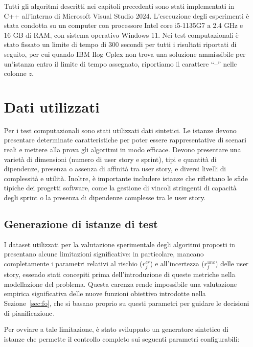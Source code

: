 \documentclass[12pt,a4paper,openright,twoside]{book}
\begin{document}
Tutti gli algoritmi descritti nei capitoli precedenti sono stati implementati in C++ all'interno di Microsoft Visual Studio 2024. L'esecuzione degli esperimenti è stata condotta su un computer con processore Intel core i5-1135G7 a 2.4 GHz e 16 GB di RAM, con sistema operativo Windows 11.
Nei test computazionali è stato fissato un limite di tempo di 300 secondi per tutti i risultati riportati di seguito, per cui quando IBM Ilog Cplex non trova una soluzione ammissibile per un'istanza entro il limite di tempo assegnato, riportiamo il carattere ``--'' nelle colonne $z$.

\section{Dati utilizzati}

Per i test computazionali sono stati utilizzati dati sintetici. Le istanze devono presentare determinate caratteristiche per poter essere rappresentative di scenari reali e mettere alla prova gli algoritmi in modo efficace. Devono presentare una varietà di dimensioni (numero di user story e sprint), tipi e quantità di dipendenze, presenza o assenza di affinità tra user story, e diversi livelli di complessità e utilità. Inoltre, è importante includere istanze che riflettano le sfide tipiche dei progetti software, come la gestione di vincoli stringenti di capacità degli sprint o la presenza di dipendenze complesse tra le user story.


\subsection{Generazione di istanze di test}

I dataset utilizzati per la valutazione sperimentale degli algoritmi proposti in \cite{BOSCHETTI2014116} presentano alcune limitazioni significative: in particolare, mancano completamente i parametri relativi al rischio ($r_j^{cr}$) e all'incertezza ($r_j^{unc}$) delle user story, essendo stati concepiti prima dell'introduzione di queste metriche nella modellazione del problema. Questa carenza rende impossibile una valutazione empirica significativa delle nuove funzioni obiettivo introdotte nella Sezione~\ref{sec:fo}, che si basano proprio su questi parametri per guidare le decisioni di pianificazione.

Per ovviare a tale limitazione, è stato sviluppato un generatore sintetico di istanze che permette il controllo completo sui seguenti parametri configurabili:
\end{document}
